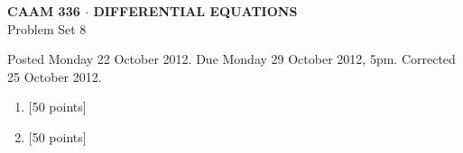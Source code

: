 \documentclass[10pt]{article}
\begin{document}

\begin{center}
\large \textsf{\textbf{CAAM 336 $\cdot$ DIFFERENTIAL EQUATIONS}\\[0.5em]
 Problem Set 8 }
\end{center}

Posted Monday 22 October 2012.  Due Monday 29 October 2012, 5pm.
Corrected 25 October 2012.

\begin{enumerate}
\item {[50 points]}\\  

\item {[50 points]}\\  
\end{enumerate}
\end{document}
